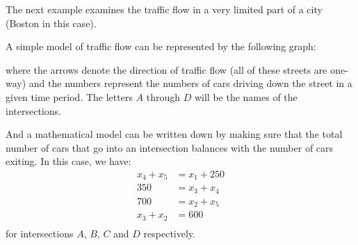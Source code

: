 The next example examines the traffic flow in a very limited part of a city (Boston in this case).

\begin{example} \label{ex:traffic}

A simple model of traffic flow can be represented by the following graph:

\begin{center}
\end{center}
where the arrows denote the direction of traffic flow (all of these streets are one-way) and the numbers represent the numbers of cars driving down the street in a given time period.  The letters $A$ through $D$ will be the names of the intersections.

And a mathematical model can be written down by making sure that the total number of cars that go into an intersection balances with the number of cars exiting.  In this case, we have:
%
\begin{align*}
x_4 + x_5 & = x_1 + 250\\
350 & = x_3 + x_4 \\
700 & = x_2 + x_5 \\
x_3 + x_2 & =  600 \\
\end{align*}
for intersections $A$, $B$, $C$ and $D$ respectively.
\end{example}


